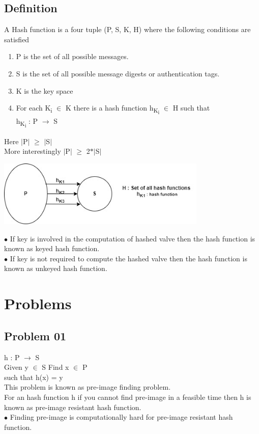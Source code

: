 \documentclass[11pt]{article}
\begin{document}
	\subsection{Definition}
	A Hash function is a four tuple (P, S, K, H) where the following conditions are satisfied 
	\begin{enumerate}
		\item P is the set of all possible messages.
		\item S is the set of all possible message digests or authentication tags.
		\item K is the key space
		\item For each K\textsubscript{i} $\in$ K there is a hash function h\textsubscript{K\textsubscript{i}} $\in$ H such that\\
		h\textsubscript{K\textsubscript{i}} : P $\rightarrow$ S
	\end{enumerate}
	Here $|$P$|$ $\geq$ $|$S$|$\\
	More interestingly $|$P$|$ $\geq$ 2$\ast|$S$|$\\
	\begin{center}
		\includegraphics[width=10cm]{Hash2.jpg}
	\end{center}
	$\bullet$ If key is involved in the computation of hashed valve then the hash function is known as keyed hash function.\\
	$\bullet$ If key is not required to compute the hashed valve then the hash function is known as unkeyed hash function.
	\section{Problems}
	\subsection{Problem 01}
	h : P $\rightarrow$ S\\
	Given y $\in$ S Find x $\in$ P\\
	such that h(x) = y\\
	This problem is known as pre-image finding problem.\\
	For an hash function h if you cannot find pre-image in a feasible time then h is known as pre-image resistant hash function.\\
	$\bullet$ Finding pre-image is computationally hard for pre-image resistant hash function.
\end{document}
